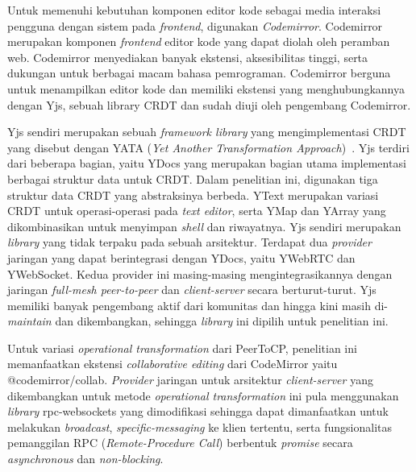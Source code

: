 Untuk memenuhi kebutuhan komponen editor kode sebagai media interaksi pengguna dengan sistem pada \textit{frontend}, digunakan \textit{Codemirror}. Codemirror merupakan komponen \textit{frontend} editor kode yang dapat diolah oleh peramban web. Codemirror menyediakan banyak ekstensi, aksesibilitas tinggi, serta dukungan untuk berbagai macam bahasa pemrograman. Codemirror berguna untuk menampilkan editor kode dan memiliki ekstensi yang menghubungkannya dengan Yjs, sebuah library CRDT dan sudah diuji oleh pengembang Codemirror.

Yjs sendiri merupakan sebuah \textit{framework library} yang mengimplementasi CRDT yang disebut dengan YATA (\textit{Yet Another Transformation Approach})~\citep{Nicolaescu2016yjs}. Yjs terdiri dari beberapa bagian, yaitu YDocs yang merupakan bagian utama implementasi berbagai struktur data untuk CRDT. Dalam penelitian ini, digunakan tiga struktur data CRDT yang abstraksinya berbeda. YText merupakan variasi CRDT untuk operasi-operasi pada \textit{text editor}, serta YMap dan YArray yang dikombinasikan untuk menyimpan \textit{shell} dan riwayatnya. Yjs sendiri merupakan \textit{library} yang tidak terpaku pada sebuah arsitektur. Terdapat dua \textit{provider} jaringan yang dapat berintegrasi dengan YDocs, yaitu YWebRTC dan YWebSocket. Kedua provider ini masing-masing mengintegrasikannya dengan jaringan \textit{full-mesh peer-to-peer} dan \textit{client-server} secara berturut-turut. Yjs memiliki banyak pengembang aktif dari komunitas dan hingga kini masih di-\textit{maintain} dan dikembangkan, sehingga \textit{library} ini dipilih untuk penelitian ini.

Untuk variasi \textit{operational transformation} dari PeerToCP, penelitian ini memanfaatkan ekstensi \textit{collaborative editing} dari CodeMirror yaitu @codemirror/collab. \textit{Provider} jaringan untuk arsitektur \textit{client-server} yang dikembangkan untuk metode \textit{operational transformation} ini pula menggunakan \textit{library} rpc-websockets yang dimodifikasi sehingga dapat dimanfaatkan untuk melakukan \textit{broadcast}, \textit{specific-messaging} ke klien tertentu, serta fungsionalitas pemanggilan RPC (\textit{Remote-Procedure Call}) berbentuk \textit{promise} secara \textit{asynchronous} dan \textit{non-blocking}.

